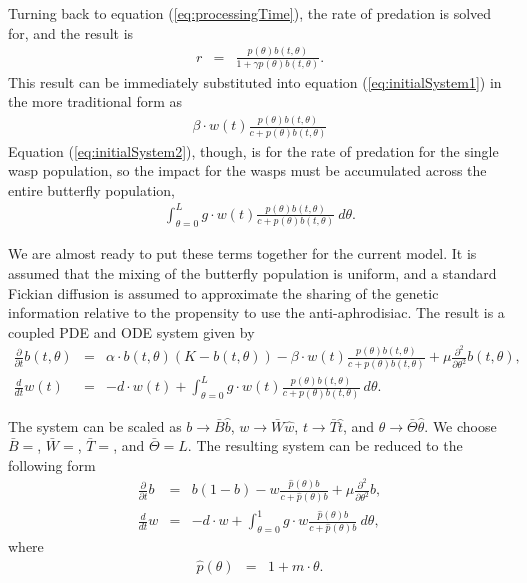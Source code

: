 \documentclass[12pt]{article}
\begin{document}
Turning back to equation (\ref{eq:processingTime}), the rate of
predation is solved for, and the result is
\begin{eqnarray}
  \label{eq:rateOfPredation}
  r & = &  \frac{p(\theta) b(t,\theta) }{1 + \gamma p(\theta) b(t,\theta)}.
\end{eqnarray}
This result can be immediately substituted into equation
(\ref{eq:initialSystem1}) in the more traditional form as
\begin{eqnarray}
  \label{eq:butterflyPredationRate}
  \beta \cdot w(t) \frac{p(\theta) b(t,\theta) }{c +  p(\theta) b(t,\theta)}
\end{eqnarray}
Equation (\ref{eq:initialSystem2}), though, is for the rate of predation
for the single wasp population, so the impact for the wasps must be
accumulated across the entire butterfly population,
\begin{eqnarray}
  \label{eq:waspPredationRate}
  \int^L_{\theta=0} g \cdot w(t) \frac{p(\theta) b(t,\theta) }{c + p(\theta) b(t,\theta)} ~ d\theta.
\end{eqnarray}

We are almost ready to put these terms together for the current
model. It is assumed that the mixing of the butterfly population is
uniform, and a standard Fickian diffusion is assumed to approximate
the sharing of the genetic information relative to the propensity to
use the anti-aphrodisiac. The result is a coupled PDE and ODE system
given by 
\begin{eqnarray}
  \label{eq:odePDE1}
  \frac{\partial}{\partial t} b(t,\theta) & = &
      \alpha \cdot b(t,\theta) (K - b(t,\theta))
      - \beta \cdot w(t) \frac{p(\theta) b(t,\theta)}{c+p(\theta)b(t,\theta)}
      + \mu \frac{\partial^2}{\partial \theta^2} b(t,\theta) , \\
  \label{eq:odePDE2}
  \frac{d}{dt} w(t) & = & -d \cdot w(t) +
      \int^L_{\theta=0} g \cdot w(t) \frac{p(\theta) b(t,\theta) }{c + p(\theta) b(t,\theta)} ~ d\theta.
\end{eqnarray}

The system can be scaled as $b\rightarrow \bar{B}\hat{b}$,
$w\rightarrow \bar{W}\hat{w}$, $t\rightarrow \bar{T}\hat{t}$, and
$\theta\rightarrow \bar{\Theta}\hat{\theta}$. We choose $\bar{B}=$,
$\bar{W}=$, $\bar{T}=$, and $\bar{\Theta}=L$. The resulting system
can be reduced to the following form
\begin{eqnarray}
  \label{eq:scaledodePDE1}
  \frac{\partial}{\partial t} b & = &
      b (1 - b)
      -  w \frac{\hat{p}(\theta) b}{c+\hat{p}(\theta)b}
      + \mu \frac{\partial^2}{\partial \theta^2} b , \\
  \label{eq:scaledodePDE2}
  \frac{d}{dt} w & = & -d \cdot w +
      \int^1_{\theta=0} g \cdot w \frac{\hat{p}(\theta) b }{c + \hat{p}(\theta) b} ~ d\theta,
\end{eqnarray}
where
\begin{eqnarray}
  \hat{p}(\theta) & = & 1 + m \cdot \theta.
\end{eqnarray}
\end{document}
